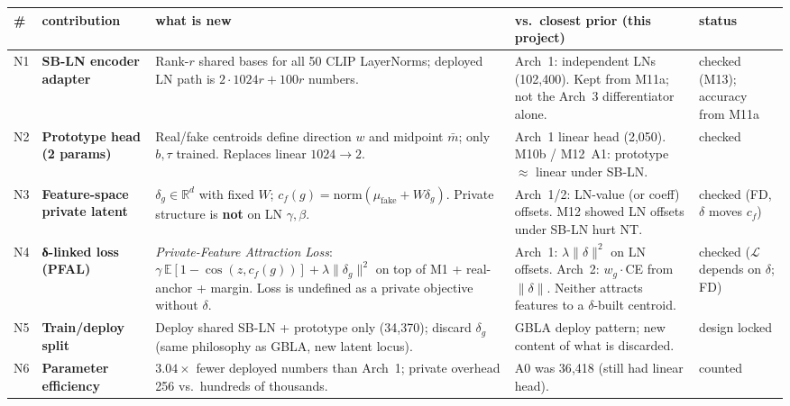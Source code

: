\documentclass[11pt]{article}
\begin{document}
\small
\renewcommand{\arraystretch}{1.3}
\begin{tabular}{L{7mm}L{42mm}L{78mm}L{72mm}L{36mm}}
\toprule
\# & contribution & what is new & vs.\ closest prior (this project) & status \\
\midrule
N1 & \textbf{SB-LN encoder adapter} & Rank-\(r\) shared bases for all 50 CLIP LayerNorms; deployed LN path is \(2{\cdot}1024r+100r\) numbers. & Arch~1: independent LNs (102{,}400). Kept from M11a; not the Arch~3 differentiator alone. & checked (M13); accuracy from M11a \\
N2 & \textbf{Prototype head (2 params)} & Real/fake centroids define direction \(w\) and midpoint \(\bar m\); only \(b,\tau\) trained. Replaces linear \(1024{\to}2\). & Arch~1 linear head (2{,}050). M10b / M12~A1: prototype \(\approx\) linear under SB-LN. & checked \\
N3 & \textbf{Feature-space private latent} & \(\delta_g\in\mathbb{R}^{d}\) with fixed \(W\); \(c_f(g)=\mathrm{norm}(\mu_\text{fake}+W\delta_g)\). Private structure is \textbf{not} on LN \(\gamma,\beta\). & Arch~1/2: LN-value (or coeff) offsets. M12 showed LN offsets under SB-LN hurt NT. & checked (FD, \(\delta\) moves \(c_f\)) \\
N4 & \textbf{δ-linked loss (PFAL)} & \emph{Private-Feature Attraction Loss}: \(\gamma\,\mathbb{E}[1-\cos(z,c_f(g))]+\lambda\|\delta_g\|^2\) on top of M1 + real-anchor + margin. Loss is undefined as a private objective without \(\delta\). & Arch~1: \(\lambda\|\delta\|^2\) on LN offsets. Arch~2: \(w_g{\cdot}\)CE from \(\|\delta\|\). Neither attracts features to a \(\delta\)-built centroid. & checked (\(\mathcal{L}\) depends on \(\delta\); FD) \\
N5 & \textbf{Train/deploy split} & Deploy shared SB-LN + prototype only (34{,}370); discard \(\delta_g\) (same philosophy as GBLA, new latent locus). & GBLA deploy pattern; new content of what is discarded. & design locked \\
N6 & \textbf{Parameter efficiency} & \(3.04\times\) fewer deployed numbers than Arch~1; private overhead 256 vs.\ hundreds of thousands. & A0 was 36{,}418 (still had linear head). & counted \\
\bottomrule
\end{tabular}
\end{document}
